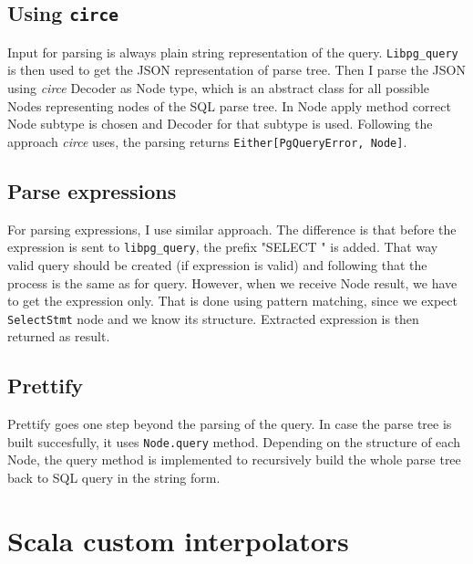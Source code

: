\documentclass[thesis=B,english]{FITthesis}[2019/12/23]
\begin{document}
\subsection{Using \texttt{circe}}
Input for parsing is always plain string representation of the query. \texttt{Libpg\_query} is then used to get the JSON representation of parse tree. Then I parse the JSON using \textit{circe} Decoder as Node type, which is an abstract class for all possible Nodes representing nodes of the SQL parse tree. In Node apply method correct Node subtype is chosen and Decoder for that subtype is used. Following the approach \textit{circe} uses, the parsing returns \texttt{Either[PgQueryError, Node]}.

\subsection{Parse expressions}
For parsing expressions, I use similar approach. The difference is that before the expression is sent to \texttt{libpg\_query}, the prefix "SELECT " is added. That way valid query should be created (if expression is valid) and following that the process is the same as for query. However, when we receive Node result, we have to get the expression only. That is done using pattern matching, since we expect \texttt{SelectStmt} node and we know its structure. Extracted expression is then returned as result.

\subsection{Prettify}
Prettify goes one step beyond the parsing of the query. In case the parse tree is built succesfully, it uses \texttt{Node.query} method. Depending on the structure of each Node, the query method is implemented to recursively build the whole parse tree back to SQL query in the string form.


\section{Scala custom interpolators}
\end{document}
